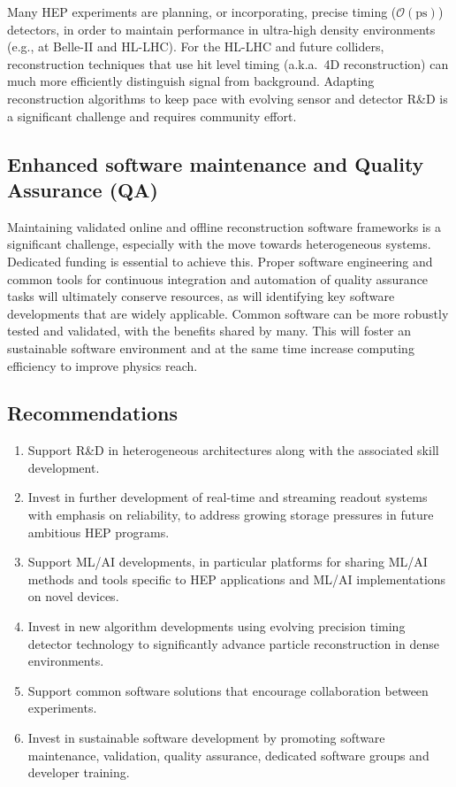 \documentclass[10pt,a4paper]{article}
\begin{document}
Many HEP experiments are planning, or incorporating, precise timing
($\mathcal{O}(\mathrm{ps})$) detectors, in order to maintain performance in
ultra-high density environments (e.g., at Belle-II and HL-LHC). For the HL-LHC
and future colliders, reconstruction techniques that use hit level timing
(a.k.a.~4D reconstruction) can much more efficiently distinguish signal from
background. Adapting reconstruction algorithms to keep pace with evolving sensor
and detector R\&D is a significant challenge and requires community effort.

\subsection{Enhanced software maintenance and Quality Assurance
(QA)}\label{enhanced-software-maintenance-and-quality-assurance-qa}

Maintaining validated online and offline reconstruction software frameworks is a
significant challenge, especially with the move towards heterogeneous systems.
Dedicated funding is essential to achieve this. Proper software engineering and
common tools for continuous integration and automation of quality assurance
tasks will ultimately conserve resources, as will identifying key software
developments that are widely applicable. Common software can be more robustly
tested and validated, with the benefits shared by many. This will foster an
sustainable software environment and at the same time increase computing
efficiency to improve physics reach.

\subsection{Recommendations}\label{recommendations-2}

\begin{enumerate}
\def\labelenumi{\arabic{enumi}.}
\item
  Support R\&D in heterogeneous architectures along with the associated
  skill development.
\item
  Invest in further development of real-time and streaming readout systems with
  emphasis on reliability, to address growing storage pressures in future
  ambitious HEP programs.
\item
  Support ML/AI developments, in particular platforms for sharing ML/AI
  methods and tools specific to HEP applications and ML/AI
  implementations on novel devices.
\item
  Invest in new algorithm developments using evolving precision timing
  detector technology to significantly advance particle reconstruction
  in dense environments.
\item
  Support common software solutions that encourage collaboration between
  experiments.
\item
  Invest in sustainable software development by promoting software
  maintenance, validation, quality assurance, dedicated software groups
  and developer training.
\end{enumerate}
\end{document}
